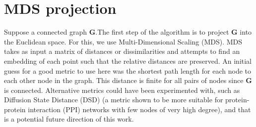 \documentclass{report}
\begin{document}
%

\section{MDS projection}
Suppose a connected graph $\textbf{G}$.The first step of the algorithm is to project $\textbf{G}$ into the Euclidean space. For this, we use Multi-Dimensional Scaling (MDS). MDS takes as input a matrix of distances or dissimilarities and attempts to find an embedding of each point such that the relative distances are preserved. An initial guess for a good metric to use here was the shortest path length for each node to each other node in the graph. This distance is finite for all pairs of nodes since $\textbf{G}$ is connected. Alternative metrics could have been experimented with, such as Diffusion State Distance (DSD) \cite{cao2013going} (a metric shown to be more suitable for protein-protein interaction (PPI) networks with few nodes of very high degree), and that is a potential future direction of this work.
\end{document}
